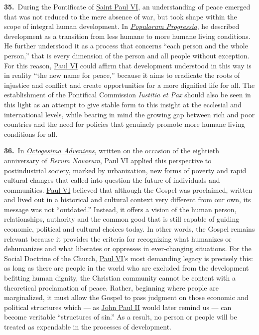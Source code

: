 \documentclass{article}
\begin{document}
\textbf{35.}\ During the Pontificate of \href{https://www.vatican.va/content/paul-vi/en.html}{Saint Paul VI}, an understanding of peace emerged that was not reduced to the mere absence of war, but took shape within the scope of integral human development. In \href{http://vatican.va/content/paul-vi/en/encyclicals/documents/hf_p-vi_enc_26031967_populorum.html}{\emph{Populorum Progressio}}, he described development as a transition from less humane to more humane living conditions. He further understood it as a process that concerns ``each person and the whole person,''\cite{n31} that is every dimension of the person and all people without exception. For this reason, \href{https://www.vatican.va/content/paul-vi/en.html}{Paul VI} could affirm that development understood in this way is in reality ``the new name for peace,''\cite{n32} because it aims to eradicate the roots of injustice and conflict and create opportunities for a more dignified life for all. The establishment of the Pontifical Commission \emph{Iustitia et Pax} should also be seen in this light as an attempt to give stable form to this insight at the ecclesial and international levels, while bearing in mind the growing gap between rich and poor countries and the need for policies that genuinely promote more humane living conditions for all.

\textbf{36.}\ In \href{https://www.vatican.va/content/paul-vi/en/apost_letters/documents/hf_p-vi_apl_19710514_octogesima-adveniens.html}{\emph{Octogesima Adveniens}}, written on the occasion of the eightieth anniversary of \href{https://www.vatican.va/content/leo-xiii/en/encyclicals/documents/hf_l-xiii_enc_15051891_rerum-novarum.html}{\emph{Rerum Novarum}}, \href{https://www.vatican.va/content/paul-vi/en.html}{Paul VI} applied this perspective to postindustrial society, marked by urbanization, new forms of poverty and rapid cultural changes that called into question the future of individuals and communities. \href{https://www.vatican.va/content/paul-vi/en.html}{Paul VI} believed that although the Gospel was proclaimed, written and lived out in a historical and cultural context very different from our own, its message was not ``outdated.''\cite{n33} Instead, it offers a vision of the human person, relationships, authority and the common good that is still capable of guiding economic, political and cultural choices today. In other words, the Gospel remains relevant because it provides the criteria for recognizing what humanizes or dehumanizes and what liberates or oppresses in ever-changing situations. For the Social Doctrine of the Church, \href{https://www.vatican.va/content/paul-vi/en.html}{Paul VI}'s most demanding legacy is precisely this: as long as there are people in the world who are excluded from the development befitting human dignity, the Christian community cannot be content with a theoretical proclamation of peace. Rather, beginning where people are marginalized, it must allow the Gospel to pass judgment on those economic and political structures which --- as \href{https://www.vatican.va/content/john-paul-ii/en.html}{John Paul II} would later remind us --- can become veritable ``structures of sin.''\cite{n34} As a result, no person or people will be treated as expendable in the processes of development.
\end{document}
